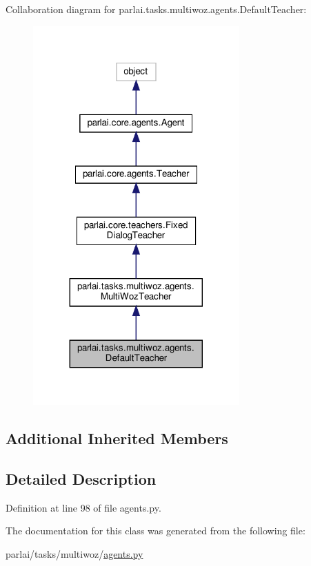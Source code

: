Collaboration diagram for parlai.\+tasks.\+multiwoz.\+agents.\+Default\+Teacher\+:
\nopagebreak
\begin{figure}[H]
\begin{center}
\leavevmode
\includegraphics[width=224pt]{classparlai_1_1tasks_1_1multiwoz_1_1agents_1_1DefaultTeacher__coll__graph}
\end{center}
\end{figure}
\subsection*{Additional Inherited Members}


\subsection{Detailed Description}


Definition at line 98 of file agents.\+py.



The documentation for this class was generated from the following file\+:\begin{DoxyCompactItemize}
\item 
parlai/tasks/multiwoz/\hyperlink{parlai_2tasks_2multiwoz_2agents_8py}{agents.\+py}\end{DoxyCompactItemize}
